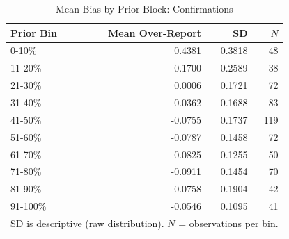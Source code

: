 \begin{table}[htbp]
\centering
\caption{Mean Bias by Prior Block: Confirmations}
\label{tab:conf_bias_prior}
\begin{tabular}{lrrr}
\hline
Prior Bin & Mean Over-Report & SD & $N$ \\
\hline
0-10\% & 0.4381 & 0.3818 & 48 \\
11-20\% & 0.1700 & 0.2589 & 38 \\
21-30\% & 0.0006 & 0.1721 & 72 \\
31-40\% & -0.0362 & 0.1688 & 83 \\
41-50\% & -0.0755 & 0.1737 & 119 \\
51-60\% & -0.0787 & 0.1458 & 72 \\
61-70\% & -0.0825 & 0.1255 & 50 \\
71-80\% & -0.0911 & 0.1454 & 70 \\
81-90\% & -0.0758 & 0.1904 & 42 \\
91-100\% & -0.0546 & 0.1095 & 41 \\
\hline
\multicolumn{4}{l}{\small SD is descriptive (raw distribution). $N$ = observations per bin.} \\
\end{tabular}
\end{table}
